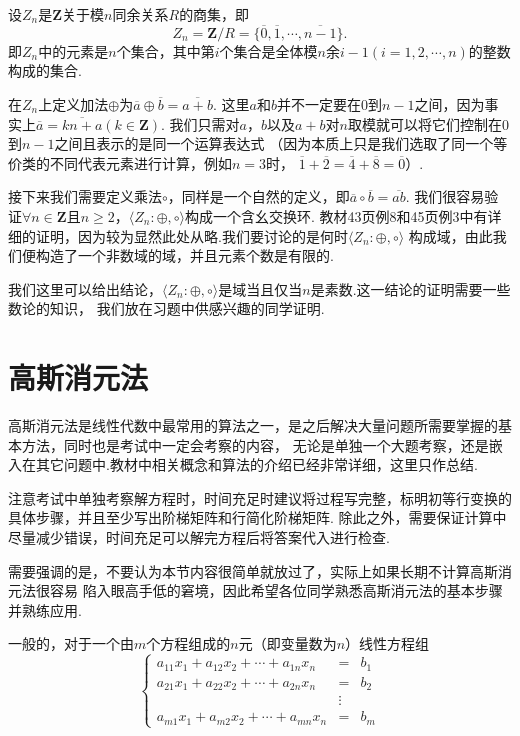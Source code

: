 \begin{example}\label{ex:1:有限域}
    设$Z_n$是$\mathbf{Z}$关于模$n$同余关系$R$的商集，即
    \[Z_n=\mathbf{Z}/R=\{\overline{0},\overline{1},\cdots,\overline{n-1}\}.\]
    即$Z_n$中的元素是$n$个集合，其中第$i$个集合是全体模$n$余$i-1(i=1,2,\cdots,n)$的整数构成的集合.

    在$Z_n$上定义加法$\oplus$为$\overline{a}\oplus\overline{b}=\overline{a+b}.$
    这里$a$和$b$并不一定要在$0$到$n-1$之间，因为事实上$\overline{a}=\overline{kn+a}(k\in\mathbf{Z})$.
    我们只需对$a$，$b$以及$a+b$对$n$取模就可以将它们控制在$0$到$n-1$之间且表示的是同一个运算表达式
    （因为本质上只是我们选取了同一个等价类的不同代表元素进行计算，例如$n=3$时，
    $\overline{1}+\overline{2}=\overline{4}+\overline{8}=\overline{0}$）.

    接下来我们需要定义乘法$\circ$，同样是一个自然的定义，即$\overline{a}\circ\overline{b}=\overline{ab}$.
    我们很容易验证$\forall n\in\mathbf{Z}\text{且}n\geqslant 2$，$\langle Z_n:\oplus,\circ\rangle$构成一个含幺交换环.
    教材43页例8和45页例3中有详细的证明，因为较为显然此处从略.我们要讨论的是何时$\langle Z_n:\oplus,\circ\rangle$
    构成域，由此我们便构造了一个非数域的域，并且元素个数是有限的.

    我们这里可以给出结论，$\langle Z_n:\oplus,\circ\rangle$是域当且仅当$n$是素数.这一结论的证明需要一些数论的知识，
    我们放在习题中供感兴趣的同学证明.
\end{example}

\section{高斯消元法}
高斯消元法是线性代数中最常用的算法之一，是之后解决大量问题所需要掌握的基本方法，同时也是考试中一定会考察的内容，
无论是单独一个大题考察，还是嵌入在其它问题中.教材中相关概念和算法的介绍已经非常详细，这里只作总结.

注意考试中单独考察解方程时，时间充足时建议将过程写完整，标明初等行变换的具体步骤，并且至少写出阶梯矩阵和行简化阶梯矩阵.
除此之外，需要保证计算中尽量减少错误，时间充足可以解完方程后将答案代入进行检查.

需要强调的是，不要认为本节内容很简单就放过了，实际上如果长期不计算高斯消元法很容易
陷入眼高手低的窘境，因此希望各位同学熟悉高斯消元法的基本步骤并熟练应用.

一般的，对于一个由$m$个方程组成的$n$元（即变量数为$n$）线性方程组
\[ \left\{
\begin{array}{rcl}
    a_{11}x_1+a_{12}x_2+\cdots+a_{1n}x_n&=&b_1 \\
    a_{21}x_1+a_{22}x_2+\cdots+a_{2n}x_n&=&b_2 \\
    &\vdots& \\
    a_{m1}x_1+a_{m2}x_2+\cdots+a_{mn}x_n&=&b_m
\end{array}
\right. \]

